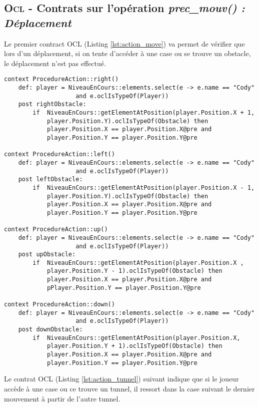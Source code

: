 
\subsection{\textsc{Ocl} - Contrats sur l'opération \emph{prec\_mouv() : Déplacement}}
\label{sec:question15}

Le premier contract OCL (Listing \ref{lst:action_move}) va permet de vérifier que lors d'un déplacement, si on tente d'accéder à une case ou se trouve un obstacle, le déplacement n'est pas effectué.

 \begin{lstlisting}[caption=On empêche le déplacement si la case est occupée par un obstacle,captionpos=b,label={lst:action_move},language=OCL]
context ProcedureAction::right()
	def: player = NiveauEnCours::elements.select(e -> e.name == "Cody"
					and e.oclIsTypeOf(Player))
	post rightObstacle:
		if 	NiveauEnCours::getElementAtPosition(player.Position.X + 1, 
			player.Position.Y).oclIsTypeOf(Obstacle) then
			player.Position.X == player.Position.X@pre and
			player.Position.Y == player.Position.Y@pre
			
context ProcedureAction::left()
	def: player = NiveauEnCours::elements.select(e -> e.name == "Cody"
					and e.oclIsTypeOf(Player))
	post leftObstacle:
		if 	NiveauEnCours::getElementAtPosition(player.Position.X - 1, 
			player.Position.Y).oclIsTypeOf(Obstacle) then
			player.Position.X == player.Position.X@pre and
			player.Position.Y == player.Position.Y@pre
			
context ProcedureAction::up()
	def: player = NiveauEnCours::elements.select(e -> e.name == "Cody"
					and e.oclIsTypeOf(Player))
	post upObstacle:
		if 	NiveauEnCours::getElementAtPosition(player.Position.X , 
			player.Position.Y - 1).oclIsTypeOf(Obstacle) then
			player.Position.X == player.Position.X@pre and
			pPlayer.Position.Y == player.Position.Y@pre
			
context ProcedureAction::down()
	def: player = NiveauEnCours::elements.select(e -> e.name == "Cody"
					and e.oclIsTypeOf(Player))
	post downObstacle:
		if 	NiveauEnCours::getElementAtPosition(player.Position.X, 
			player.Position.Y + 1).oclIsTypeOf(Obstacle) then
			player.Position.X == player.Position.X@pre and
			player.Position.Y == player.Position.Y@pre
\end{lstlisting}

Le contrat OCL (Listing \ref{lst:action_tunnel}) suivant indique que si le joueur accède à une case ou ce trouve un tunnel, il ressort dans la case suivant le dernier mouvement à partir de l'autre tunnel.

